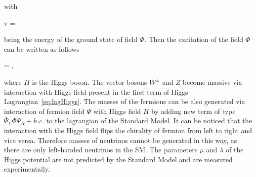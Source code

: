 with

{
v = 
}

being the energy of the ground state of field $\Phi$. Then the excitation of the field $\Phi$ can be written as follows

{
    \Phi = ,
}

where $H$ is the Higgs boson. The vector bosons $W^{\pm}$ and $Z$ become massive via interaction with Higgs field present in the first term of Higgs Lagrangian~\ref{eq:lagHiggs}. The masses of the fermions can be also generated via interaction of fermion field  $\Psi$ with Higgs field $H$ by adding new term of type $\bar{\Psi}_{L} \Phi \Psi_{R} + h.c.$ to the lagrangian of the Standard Model. It can be noticed that the interaction with the Higgs field flips the chirality of fermion from left to right and vice versa. Therefore masses of neutrinos cannot be generated in this way, as there are only left-handed neutrinos in the SM. The parameters $\mu$ and $\lambda$ of the Higgs potential are not predicted by the Standard Model and are measured experimentally.


